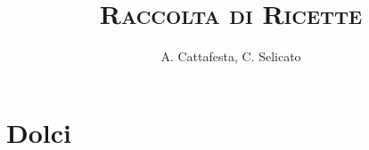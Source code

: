\documentclass[12pt, oneside]{book}
\newcommand{\parttitle}{}
\let\oldpart\part
\renewcommand{\part}[1]{%
  \def\parttitle{#1}%
  \oldpart{#1}%
}
\begin{document}
\title{\textsc{Raccolta di Ricette}}
\author{A. Cattafesta, C. Selicato}
\date{}

\maketitle
\tableofcontents

\part{Dolci}





\end{document}
